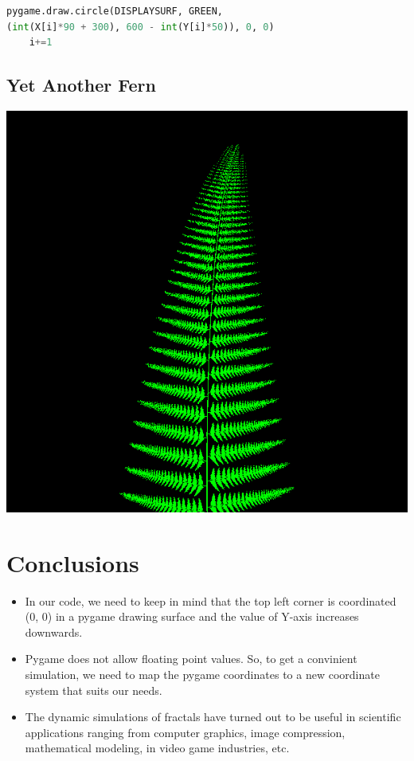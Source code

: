 \documentclass[a0,portrait]{a0poster}
\begin{document}
\begin{multicols}{3}
\begin{lstlisting}[language=Python, frame=single]
    pygame.draw.circle(DISPLAYSURF, GREEN, 
(int(X[i]*90 + 300), 600 - int(Y[i]*50)), 0, 0) 
    i+=1
\end{lstlisting}

\subsection*{Yet Another Fern}
\begin{center}\vspace{0.5cm}
\includegraphics[width=0.5\linewidth]{BarnsleyFern2}
\end{center}\vspace{1cm}

\color{SaddleBrown} %

\section*{Conclusions}

\begin{itemize}
\item In our code, we need to keep in mind that the top left corner is coordinated (0, 0) in a pygame drawing surface and the value of Y-axis increases downwards.
\item Pygame does not allow floating point values. So, to get a convinient simulation, we need to map the pygame coordinates to a new coordinate system that suits our needs.
\item The dynamic simulations of fractals have turned out to be useful in scientific applications ranging from computer graphics, image compression, mathematical modeling, in video game industries, etc.
\end{itemize}


\end{multicols}
\end{document}
